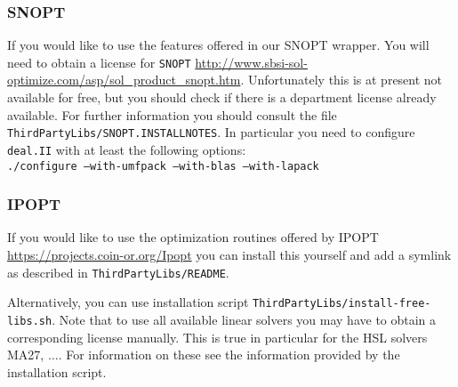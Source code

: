 \subsubsection{SNOPT}
If you would like to use the features offered in our SNOPT wrapper. You will 
need to obtain a license for \texttt{SNOPT} 
\url{http://www.sbsi-sol-optimize.com/asp/sol_product_snopt.htm}.
Unfortunately this is at present not available for free, but you should 
check if 
there is a department license already available.
For further information you should consult the file 
\texttt{ThirdPartyLibs/SNOPT.INSTALLNOTES}. In particular you need to configure 
\texttt{deal.II} with at least the following options:\\
\texttt{./configure --with-umfpack --with-blas --with-lapack}

\subsubsection{IPOPT}
If you would like to use the optimization routines offered by IPOPT
\url{https://projects.coin-or.org/Ipopt} you can  
install this yourself and add a symlink as described in \texttt{ThirdPartyLibs/README}.

Alternatively, you can use installation script
\texttt{ThirdPartyLibs/install-free-libs.sh}. Note that to use all 
available linear solvers you may have to obtain a corresponding license 
manually. This is true in particular for the HSL solvers MA27, $\ldots$.
For information on these see the information provided by the installation
script.


